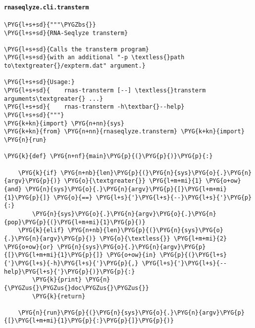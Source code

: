 \paragraph{\texttt{rnaseqlyze.cli.transterm}}
\label{index-pdf4:rnaseqlyze-cli-transterm}
\begin{Verbatim}[commandchars=\\\{\}]
\PYG{l+s+sd}{"""\PYGZbs{}}
\PYG{l+s+sd}{RNA-Seqlyze transterm}

\PYG{l+s+sd}{Calls the transterm program}
\PYG{l+s+sd}{with an additional "-p \textless{}path to\textgreater{}/expterm.dat" argument.}

\PYG{l+s+sd}{Usage:}
\PYG{l+s+sd}{    rnas-transterm [--] \textless{}transterm arguments\textgreater{} ...}
\PYG{l+s+sd}{    rnas-transterm -h\textbar{}--help}
\PYG{l+s+sd}{"""}
\PYG{k+kn}{import} \PYG{n+nn}{sys}
\PYG{k+kn}{from} \PYG{n+nn}{rnaseqlyze.transterm} \PYG{k+kn}{import} \PYG{n}{run}

\PYG{k}{def} \PYG{n+nf}{main}\PYG{p}{(}\PYG{p}{)}\PYG{p}{:}

    \PYG{k}{if} \PYG{n+nb}{len}\PYG{p}{(}\PYG{n}{sys}\PYG{o}{.}\PYG{n}{argv}\PYG{p}{)} \PYG{o}{\textgreater{}} \PYG{l+m+mi}{1} \PYG{o+ow}{and} \PYG{n}{sys}\PYG{o}{.}\PYG{n}{argv}\PYG{p}{[}\PYG{l+m+mi}{1}\PYG{p}{]} \PYG{o}{==} \PYG{l+s}{'}\PYG{l+s}{--}\PYG{l+s}{'}\PYG{p}{:}
        \PYG{n}{sys}\PYG{o}{.}\PYG{n}{argv}\PYG{o}{.}\PYG{n}{pop}\PYG{p}{(}\PYG{l+m+mi}{1}\PYG{p}{)}
    \PYG{k}{elif} \PYG{n+nb}{len}\PYG{p}{(}\PYG{n}{sys}\PYG{o}{.}\PYG{n}{argv}\PYG{p}{)} \PYG{o}{\textless{}} \PYG{l+m+mi}{2} \PYG{o+ow}{or} \PYG{n}{sys}\PYG{o}{.}\PYG{n}{argv}\PYG{p}{[}\PYG{l+m+mi}{1}\PYG{p}{]} \PYG{o+ow}{in} \PYG{p}{(}\PYG{l+s}{'}\PYG{l+s}{-h}\PYG{l+s}{'}\PYG{p}{,} \PYG{l+s}{'}\PYG{l+s}{--help}\PYG{l+s}{'}\PYG{p}{)}\PYG{p}{:}
        \PYG{k}{print} \PYG{n}{\PYGZus{}\PYGZus{}doc\PYGZus{}\PYGZus{}}
        \PYG{k}{return}

    \PYG{n}{run}\PYG{p}{(}\PYG{n}{sys}\PYG{o}{.}\PYG{n}{argv}\PYG{p}{[}\PYG{l+m+mi}{1}\PYG{p}{:}\PYG{p}{]}\PYG{p}{)}
\end{Verbatim}


